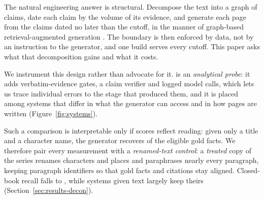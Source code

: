 The natural engineering answer is structural. Decompose the text into a graph of claims,
date each claim by the volume of its evidence, and generate each page from the claims
dated no later than the cutoff, in the manner of graph-based retrieval-augmented generation
\citep{edge2024graphrag,guo2024lightrag}. The boundary is then enforced by data, not by an
instruction to the generator, and one build serves every cutoff. This paper asks what
that decomposition gains and what it costs.

We instrument this design rather than advocate for it. \sys is an \emph{analytical probe}:
it adds verbatim-evidence gates, a claim verifier and logged model calls, which lets us
trace individual errors to the stage that produced them, and it is placed among systems that
differ in what the generator can access and in how pages are written (Figure~\ref{fig:systems}).

Such a comparison is interpretable only if scores reflect reading: given only a title and
a character name, the generator recovers  of the eligible gold
facts. We therefore pair every measurement with a \emph{renamed-text control}: a
\emph{treated} copy of the series renames characters and places and paraphrases nearly
every paragraph, keeping paragraph identifiers so that gold facts and citations stay aligned.
Closed-book recall falls to , while systems given text largely
keep theirs (Section~\ref{sec:results-decon}).

